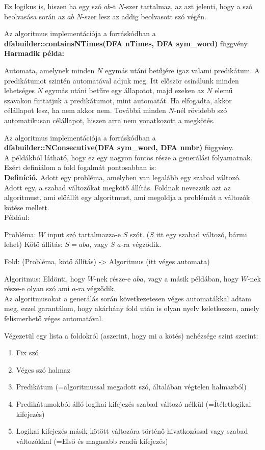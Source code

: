 \documentclass[12pt]{report}
\theoremstyle{definition}
\begin{document}
Ez logikus is, hiszen ha egy szó $ab$-t $N$-szer tartalmaz, az azt jelenti, hogy a szó beolvasása során az $ab$ $N$-szer lesz az addig beolvasott szó végén.

Az algoritmus implementációja a forráskódban a \textbf{dfabuilder::containsNTimes(DFA nTimes, DFA sym\_word)} függvény.\\

\textbf{Harmadik példa:}

Automata, amelynek minden $N$ egymás utáni betűjére igaz valami predikátum. A predikátumot szintén automatával adjuk meg. Itt először csinálunk minden lehetséges $N$ egymás utáni betűre egy állapotot, majd ezeken az $N$ elemű szavakon futtatjuk a predikátumot, mint automatát. Ha elfogadta, akkor célállapot lesz, ha nem akkor nem. Továbbá minden $N$-nél rövidebb szó automatikusan célállapot, hiszen arra nem vonatkozott a megkötés.

Az algoritmus implementációja a forráskódban a \textbf{dfabuilder::NConsecutive(DFA sym\_word, DFA nmbr)} függvény.\\

A példákból látható, hogy ez egy nagyon fontos része a generálási folyamatnak. Ezért definiálom a fold fogalmát pontosabban is:\\

\textbf{Definíció.} Adott egy probléma, amelyben van legalább egy szabad változó. Adott egy, a szabad változókat megkötő állítás. Foldnak nevezzük azt az algoritmust, ami előállít egy algoritmust, ami megoldja a problémát a változók kötése mellett.\\

Például:

Probléma: $W$ input szó tartalmazza-e $S$ szót.	($S$ itt egy szabad változó, bármi lehet)
Kötő állítás: $S = aba$, vagy $S$ $a$-ra végződik.

Fold: (Probléma, kötő állítás) -> Algoritmus (itt véges automata)

Algoritmus: Eldönti, hogy $W$-nek része-e $aba$, vagy a másik példában, hogy $W$-nek része-e olyan szó ami $a$-ra végződik.\\

Az algoritmusokat a generálás során következetesen véges automatákkal adtam meg, ezzel garantálom, hogy akárhány fold után is olyan nyelv keletkezzen, amely felismerhető véges automatával.

Végezetül egy lista a foldokról (aszerint, hogy mi a kötés) nehézsége szint szerint:
\begin{enumerate}
\item Fix szó
\item Véges szó halmaz
\item Predikátum (=algoritmussal megadott szó, általában végtelen halmazból)
\item Predikátumokból álló logikai kifejezés szabad változó nélkül (=Ítéletlogikai kifejezés)
\item Logikai kifejezés másik kötött változóra történő hivatkozással vagy szabad változókkal (=Első és magasabb rendű kifejezés)
\end{enumerate}
\end{document}
